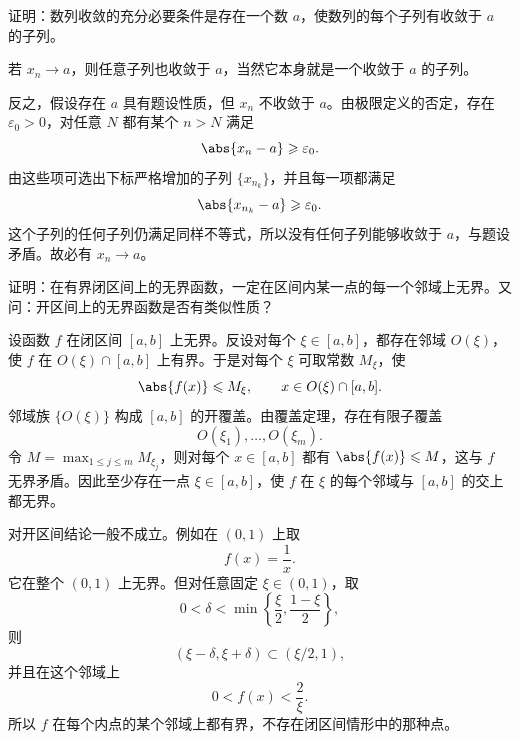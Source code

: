 \begin{xreferenceproblem}[第一组参考题 2]
证明：数列收敛的充分必要条件是存在一个数 $a$，使数列的每个子列有收敛于 $a$ 的子列。
\end{xreferenceproblem}
\begin{xsolution}
若 $x_n\to a$，则任意子列也收敛于 $a$，当然它本身就是一个收敛于 $a$ 的子列。

反之，假设存在 $a$ 具有题设性质，但 $x_n$ 不收敛于 $a$。由极限定义的否定，存在 $\varepsilon_0>0$，对任意 $N$ 都有某个 $n>N$ 满足
\[
  \abs{x_n-a}\geqslant\varepsilon_0.
\]
由这些项可选出下标严格增加的子列 $\{x_{n_k}\}$，并且每一项都满足
\[
  \abs{x_{n_k}-a}\geqslant\varepsilon_0.
\]
这个子列的任何子列仍满足同样不等式，所以没有任何子列能够收敛于 $a$，与题设矛盾。故必有 $x_n\to a$。
\end{xsolution}

\begin{xreferenceproblem}[第一组参考题 3]
证明：在有界闭区间上的无界函数，一定在区间内某一点的每一个邻域上无界。又问：开区间上的无界函数是否有类似性质？
\end{xreferenceproblem}
\begin{xsolution}
设函数 $f$ 在闭区间 $[a,b]$ 上无界。反设对每个 $\xi\in[a,b]$，都存在邻域 $O(\xi)$，使 $f$ 在 $O(\xi)\cap[a,b]$ 上有界。于是对每个 $\xi$ 可取常数 $M_\xi$，使
\[
  \abs{f(x)}\leqslant M_\xi,
  \qquad x\in O(\xi)\cap[a,b].
\]
邻域族 $\{O(\xi)\}$ 构成 $[a,b]$ 的开覆盖。由覆盖定理，存在有限子覆盖
\[
  O(\xi_1),\ldots,O(\xi_m).
\]
令 $M=\max_{1\leqslant j\leqslant m}M_{\xi_j}$，则对每个 $x\in[a,b]$ 都有 $\abs{f(x)}\leqslant M$，这与 $f$ 无界矛盾。因此至少存在一点 $\xi\in[a,b]$，使 $f$ 在 $\xi$ 的每个邻域与 $[a,b]$ 的交上都无界。

对开区间结论一般不成立。例如在 $(0,1)$ 上取
\[
  f(x)=\frac1x.
\]
它在整个 $(0,1)$ 上无界。但对任意固定 $\xi\in(0,1)$，取
\[
  0<\delta<\min\left\{\frac\xi2,\frac{1-\xi}{2}\right\},
\]
则
\[
  (\xi-\delta,\xi+\delta)\subset(\xi/2,1),
\]
并且在这个邻域上
\[
  0<f(x)<\frac2\xi.
\]
所以 $f$ 在每个内点的某个邻域上都有界，不存在闭区间情形中的那种点。
\end{xsolution}


